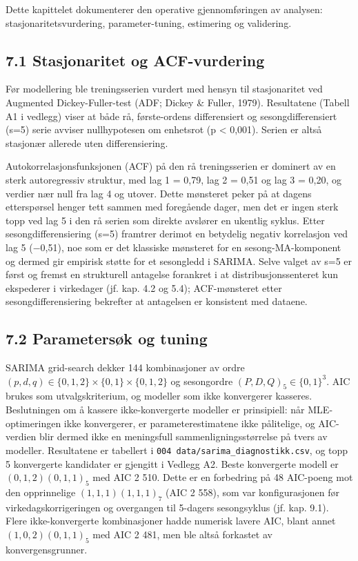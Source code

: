 \documentclass[
  norsk,
  11pt,
  a4paper,
]{article}
\begin{document}
Dette kapittelet dokumenterer den operative gjennomføringen av analysen:
stasjonaritetsvurdering, parameter-tuning, estimering og validering.

\subsection{7.1 Stasjonaritet og
ACF-vurdering}\label{stasjonaritet-og-acf-vurdering}

Før modellering ble treningsserien vurdert med hensyn til stasjonaritet
ved Augmented Dickey-Fuller-test (ADF; Dickey \& Fuller, 1979).
Resultatene (Tabell A1 i vedlegg) viser at både rå, første-ordens
differensiert og sesongdifferensiert (s=5) serie avviser nullhypotesen
om enhetsrot (p \textless{} 0,001). Serien er altså stasjonær allerede
uten differensiering.

Autokorrelasjonsfunksjonen (ACF) på den rå treningsserien er dominert av
en sterk autoregressiv struktur, med lag 1 = 0,79, lag 2 = 0,51 og lag 3
= 0,20, og verdier nær null fra lag 4 og utover. Dette mønsteret peker
på at dagens etterspørsel henger tett sammen med foregående dager, men
det er ingen sterk topp ved lag 5 i den rå serien som direkte avslører
en ukentlig syklus. Etter sesongdifferensiering (s=5) framtrer derimot
en betydelig negativ korrelasjon ved lag 5 (−0,51), noe som er det
klassiske mønsteret for en sesong-MA-komponent og dermed gir empirisk
støtte for et sesongledd i SARIMA. Selve valget av s=5 er først og
fremst en strukturell antagelse forankret i at distribusjonssenteret kun
ekspederer i virkedager (jf. kap. 4.2 og 5.4); ACF-mønsteret etter
sesongdifferensiering bekrefter at antagelsen er konsistent med dataene.

\subsection{7.2 Parametersøk og tuning}\label{parametersuxf8k-og-tuning}

SARIMA grid-search dekker 144 kombinasjoner av ordre
\((p,d,q) \in \{0,1,2\} \times \{0,1\} \times \{0,1,2\}\) og sesongordre
\((P,D,Q)_5 \in \{0,1\}^3\). AIC brukes som utvalgskriterium, og
modeller som ikke konvergerer kasseres. Beslutningen om å kassere
ikke-konvergerte modeller er prinsipiell: når MLE-optimeringen ikke
konvergerer, er parameterestimatene ikke pålitelige, og AIC-verdien blir
dermed ikke en meningsfull sammenligningsstørrelse på tvers av modeller.
Resultatene er tabellert i \texttt{004\ data/sarima\_diagnostikk.csv},
og topp 5 konvergerte kandidater er gjengitt i Vedlegg A2. Beste
konvergerte modell er \((0,1,2)(0,1,1)_5\) med AIC 2 510. Dette er en
forbedring på 48 AIC-poeng mot den opprinnelige \((1,1,1)(1,1,1)_7\)
(AIC 2 558), som var konfigurasjonen før virkedagskorrigeringen og
overgangen til 5-dagers sesongsyklus (jf. kap. 9.1). Flere
ikke-konvergerte kombinasjoner hadde numerisk lavere AIC, blant annet
\((1,0,2)(0,1,1)_5\) med AIC 2 481, men ble altså forkastet av
konvergensgrunner.
\end{document}
